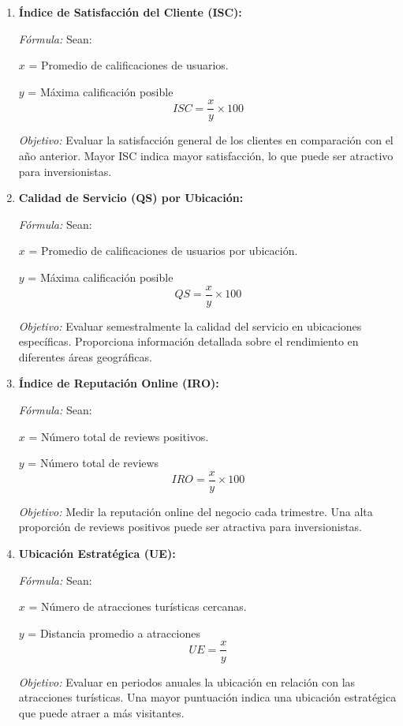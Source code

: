 \documentclass[12pt]{article}
\begin{document}
\begin{enumerate}
    \item \textbf{Índice de Satisfacción del Cliente (ISC):}
    
    \textit{Fórmula:} Sean:
    
    $x$ = Promedio de calificaciones de usuarios.
    
    $y$ = Máxima calificación posible 
    $$ISC = \frac{x}{y}\times 100$$
    
    \textit{Objetivo:} Evaluar la satisfacción general de los clientes en comparación con el año anterior. Mayor ISC indica mayor satisfacción, lo que puede ser atractivo para inversionistas.

     \item \textbf{Calidad de Servicio (QS) por Ubicación:}
     
    \textit{Fórmula:} Sean: 
    
    $x$ = Promedio de calificaciones de usuarios por ubicación.
    
    $y$ = Máxima calificación posible 
    $$QS = \frac{x}{y}\times 100$$
    
    \textit{Objetivo:} Evaluar semestralmente la calidad del servicio en ubicaciones específicas. Proporciona información detallada sobre el rendimiento en diferentes áreas geográficas.

    \item \textbf{Índice de Reputación Online (IRO):}
    
    \textit{Fórmula:} Sean:

    $x$ = Número total de reviews positivos.
    
    $y$ = Número total de reviews 
    $$ IRO = \frac{x}{y}\times 100$$
        
    \textit{Objetivo:} Medir la reputación online del negocio cada trimestre. Una alta proporción de reviews positivos puede ser atractiva para inversionistas.

    \item \textbf{Ubicación Estratégica (UE):}
    
    \textit{Fórmula:} Sean:

    $x$ = Número de atracciones turísticas cercanas.
    
    $y$ = Distancia promedio a atracciones 
    $$ UE = \frac{x}{y}$$
    
    \textit{Objetivo:} Evaluar en periodos anuales la ubicación en relación con las atracciones turísticas. Una mayor puntuación indica una ubicación estratégica que puede atraer a más visitantes.


\end{enumerate}
\end{document}
